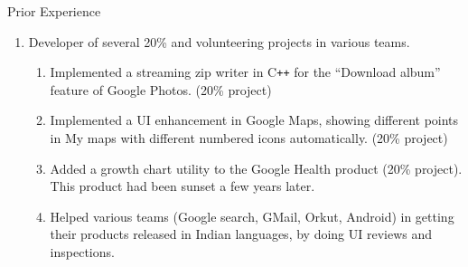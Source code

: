 \documentclass{resume}
\newcommand{\CC}{C{\tt ++}}
\begin{document}
\begin{category}{Prior Experience}
\begin{enumerate}
\item Developer of several 20\% and volunteering projects in various teams.
  \begin{enumerate}
  \item Implemented a streaming zip writer in \CC{} for the ``Download album'' feature of Google Photos.  (20\% project)
  \item Implemented a UI enhancement in Google Maps, showing different points in My maps with different numbered icons automatically. (20\% project)
  \item Added a growth chart utility to the Google Health product (20\% project).  This product had been sunset a few years later.
  \item Helped various teams (Google search, GMail, Orkut, Android) in getting their products released in Indian languages, by doing UI reviews and inspections.
  \end{enumerate}



 



\end{enumerate}
\end{category}
\end{document}
